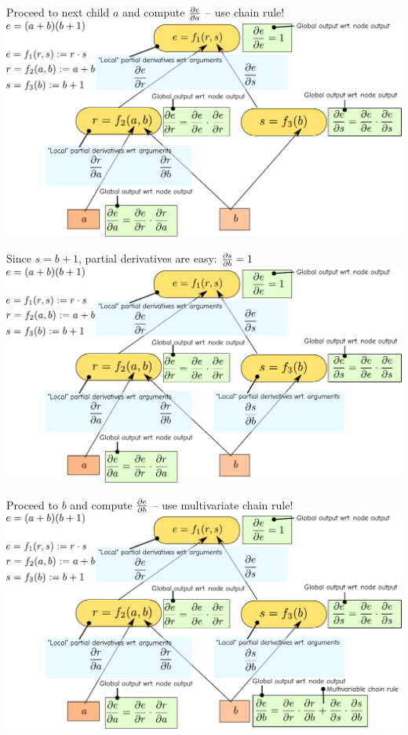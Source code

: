 \documentclass[12pt,aspectratio=169,handout]{beamer}
\begin{document}
\begin{frame}{Proceed to next child $a$ and compute $\pdv{e}{a}$ -- use chain rule!}
	\includegraphics[width=1.1\linewidth]{img/backprop08.pdf}
\end{frame}

\begin{frame}{Since $s = b + 1$, partial derivatives are easy: $\pdv{s}{b} = 1$}
	\includegraphics[width=1.1\linewidth]{img/backprop09.pdf}
\end{frame}

\begin{frame}{Proceed to $b$ and compute $\pdv{e}{b}$ -- use multivariate chain rule!}
	\includegraphics[width=1.1\linewidth]{img/backprop10.pdf}
\end{frame}
\end{document}
